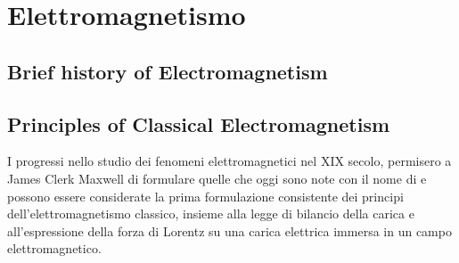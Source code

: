 \documentclass[letterpaper,10pt,italian]{jupyterBook}
\begin{document}
\sphinxAtStartPar
{\hyperref[\detokenize{ch/waves:classical-electromagnetism-waves}]{}}

\sphinxAtStartPar
{\hyperref[\detokenize{ch/circuits:classical-electromagnetism-circuits}]{}}  

\sphinxAtStartPar
{}

\sphinxAtStartPar
{\hyperref[\detokenize{ch/optics:classical-electromagnetism-optics}]{}}

\sphinxAtStartPar
{}  

\sphinxstepscope


\part{Elettromagnetismo}

\sphinxstepscope




\chapter{Brief history of Electromagnetism}
\label{\detokenize{ch/experiments:brief-history-of-electromagnetism}}\label{\detokenize{ch/experiments:classical-electromagnetism-first-experiments}}\label{\detokenize{ch/experiments::doc}}
\sphinxstepscope




\chapter{Principles of Classical Electromagnetism}
\label{\detokenize{ch/principles:principles-of-classical-electromagnetism}}\label{\detokenize{ch/principles:classical-electromagnetism-principles}}\label{\detokenize{ch/principles::doc}}
\sphinxAtStartPar
I progressi nello studio dei fenomeni elettromagnetici nel XIX secolo, permisero a James Clerk Maxwell di formulare quelle che oggi sono note con il nome di  e possono essere considerate la prima formulazione consistente dei principi dell’elettromagnetismo classico, insieme alla legge di bilancio della carica e all’espressione della forza di Lorentz su una carica elettrica immersa in un campo elettromagnetico.
\end{document}
